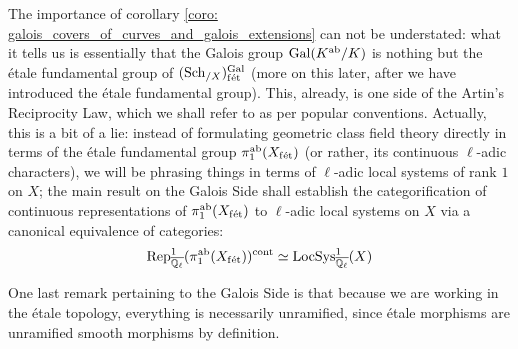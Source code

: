            The importance of corollary \ref{coro: galois_covers_of_curves_and_galois_extensions} can not be understated: what it tells us is essentially that the Galois group $\mathrm{Gal}(K^{\mathrm{ab}}/K)$ is nothing but the \'etale fundamental group of $(\mathrm{Sch}_{/X})_{\mathrm{f\acute{e}t}}^{\mathrm{Gal}}$ (more on this later, after we have introduced the \'etale fundamental group). This, already, is one side of the Artin's Reciprocity Law, which we shall refer to as  per popular conventions. Actually, this is a bit of a lie: instead of formulating geometric class field theory directly in terms of the \'etale fundamental group $\pi_1^{\mathrm{ab}}(X_{\mathrm{f\acute{e}t}})$ (or rather, its continuous $\ell$-adic characters), we will be phrasing things in terms of $\ell$-adic local systems of rank $1$ on $X$; the main result on the Galois Side shall establish the categorification of continuous representations of $\pi_1^{\mathrm{ab}}(X_{\mathrm{f\acute{e}t}})$ to $\ell$-adic local systems on $X$ via a canonical equivalence of categories:
                $$\mathrm{Rep}^1_{\overline{\mathbb{Q}_{\ell}}}(\pi_1^{\mathrm{ab}}(X_{\mathrm{f\acute{e}t}}))^{\mathrm{cont}} \simeq \mathrm{LocSys}^1_{\overline{\mathbb{Q}_{\ell}}}(X)$$
            
            One last remark pertaining to the Galois Side is that because we are working in the \'etale topology, everything is necessarily unramified, since \'etale morphisms are unramified smooth morphisms by definition.
        
